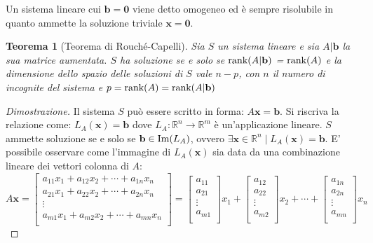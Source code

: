 \documentclass{article}
\newtheorem{theorem}{Teorema}
\begin{document}
    Un sistema lineare cui $\mathbf{b} = \mathbf{0}$ viene detto omogeneo ed è sempre risolubile in quanto ammette la soluzione triviale $\mathbf{x} = \mathbf{0}$.

    \vspace{10pt}
    \begin{theorem}[Teorema di Rouché-Capelli] 
        Sia $S$ un sistema lineare e sia $A | \mathbf{b}$ la sua matrice aumentata. $S$ ha soluzione se e solo se 
        $\textnormal{rank}(A | \mathbf{b})$ = $\textnormal{rank}(A)$ e la dimensione dello spazio delle soluzioni di $S$ vale $n - p$,
        con $n$ il numero di incognite del sistema e $p = \textnormal{rank}(A) = \textnormal{rank}(A | \mathbf{b})$
    \end{theorem}

    \begin{proof}[Dimostrazione] 
        Il sistema $S$ può essere scritto in forma: $A\mathbf{x} = \mathbf{b}$. Si riscriva la relazione come: $L_A(\mathbf{x}) = \mathbf{b}$ dove $L_A: \mathbb{R}^n \rightarrow \mathbb{R}^m$ è un'applicazione lineare.
        $S$ ammette soluzione se e solo se $\mathbf{b} \in \textnormal{Im}(L_A)$, ovvero $\exists \mathbf{x} \in \mathbb{R}^n \; | \; L_A(\mathbf{x}) = \mathbf{b}$. E' possibile osservare come l'immagine di $L_A(\mathbf{x})$
        sia data da una combinazione lineare dei vettori colonna di $A$:
        \[
            A\mathbf{x} = 
            \begin{bmatrix}
                a_{11}x_{1} + a_{12}x_{2} + \cdots + a_{1n}x_{n} \\
                a_{21}x_{1} + a_{22}x_{2} + \cdots + a_{2n}x_{n} \\
                \vdots \\
                a_{m1}x_{1} + a_{m2}x_{2} + \cdots + a_{mn}x_{n} \\
            \end{bmatrix}
            = 
            \begin{bmatrix}
                a_{11} \\
                a_{21} \\
                \vdots \\
                a_{m1} \\
            \end{bmatrix}
            x_{1}
            + 
            \begin{bmatrix}
                a_{12} \\
                a_{22} \\
                \vdots \\
                a_{m2} \\
            \end{bmatrix}
            x_{2}
            +
            \cdots
            +
            \begin{bmatrix}
                a_{1n} \\
                a_{2n} \\
                \vdots \\
                a_{mn} \\
            \end{bmatrix}
            x_{n}
        \]    


\end{proof}
\end{document}
